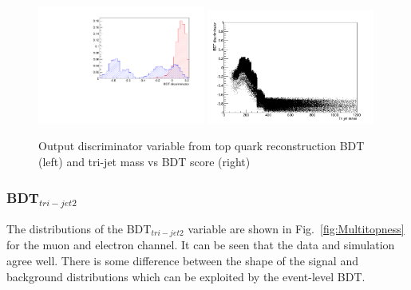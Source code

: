\begin{figure}[!ht]
\centering
    \includegraphics[width=0.49\textwidth]{images/Run1/BDT_Disc.pdf}
    \includegraphics[width=0.49\textwidth]{images/Run1/TrijetmassVsBDT.png}
    \caption{Output discriminator variable from top quark reconstruction BDT (left) and tri-jet mass vs BDT score (right)}
    \label{fig:TopBDToutput}
\end{figure}

\subsubsection*{BDT$_{tri-jet2}$}
The distributions of the BDT$_{tri-jet2}$ variable are shown in Fig.~\ref{fig:Multitopness} for the muon and electron channel. It can be seen that the data and simulation agree well. There is some difference between the shape of the signal and background distributions which can be exploited by the event-level BDT.

